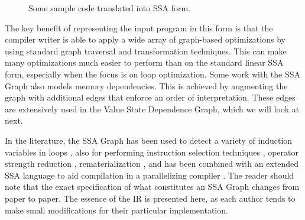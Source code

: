\begin{figure}[ht]
\centering
{}
\caption{Some sample code translated into SSA form.}
\label{fig: ssa-graph-example-code}
\end{figure}

The key benefit of representing the input program in this form is that the compiler writer is able to apply a wide array of graph-based optimizations by using standard graph traversal and transformation techniques. This can make many optimizations much easier to perform than on the standard linear SSA form, especially when the focus is on loop optimization. Some work \cite{1375663} with the SSA Graph also models memory dependencies. This is achieved by augmenting the graph with additional edges that enforce an order of interpretation. These edges are extensively used in the Value State Dependence Graph, which we will look at next.

In the literature, the SSA Graph has been used to detect a variety of induction variables in loops \cite{143131,201003}, also for performing instruction selection techniques \cite{1375663,1269857}, operator strength reduction \cite{504710}, rematerialization \cite{143143}, and has been combined with an extended SSA language to aid compilation in a parallelizing compiler \cite{Stoltz_extendedssa}. The reader should note that the exact specification of what constitutes an SSA Graph changes from paper to paper. The essence of the IR is presented here, as each author tends to make small modifications for their particular implementation.

